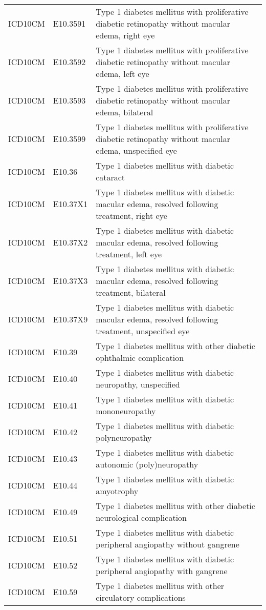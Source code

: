 \begin{longtable}{p{}p{}p{}}
  ICD10CM & E10.3591 & Type 1 diabetes mellitus with proliferative diabetic retinopathy without macular edema, right eye \\ 
  ICD10CM & E10.3592 & Type 1 diabetes mellitus with proliferative diabetic retinopathy without macular edema, left eye \\ 
  ICD10CM & E10.3593 & Type 1 diabetes mellitus with proliferative diabetic retinopathy without macular edema, bilateral \\ 
  ICD10CM & E10.3599 & Type 1 diabetes mellitus with proliferative diabetic retinopathy without macular edema, unspecified eye \\ 
  ICD10CM & E10.36 & Type 1 diabetes mellitus with diabetic cataract \\ 
  ICD10CM & E10.37X1 & Type 1 diabetes mellitus with diabetic macular edema, resolved following treatment, right eye \\ 
  ICD10CM & E10.37X2 & Type 1 diabetes mellitus with diabetic macular edema, resolved following treatment, left eye \\ 
  ICD10CM & E10.37X3 & Type 1 diabetes mellitus with diabetic macular edema, resolved following treatment, bilateral \\ 
  ICD10CM & E10.37X9 & Type 1 diabetes mellitus with diabetic macular edema, resolved following treatment, unspecified eye \\ 
  ICD10CM & E10.39 & Type 1 diabetes mellitus with other diabetic ophthalmic complication \\ 
  ICD10CM & E10.40 & Type 1 diabetes mellitus with diabetic neuropathy, unspecified \\ 
  ICD10CM & E10.41 & Type 1 diabetes mellitus with diabetic mononeuropathy \\ 
  ICD10CM & E10.42 & Type 1 diabetes mellitus with diabetic polyneuropathy \\ 
  ICD10CM & E10.43 & Type 1 diabetes mellitus with diabetic autonomic (poly)neuropathy \\ 
  ICD10CM & E10.44 & Type 1 diabetes mellitus with diabetic amyotrophy \\ 
  ICD10CM & E10.49 & Type 1 diabetes mellitus with other diabetic neurological complication \\ 
  ICD10CM & E10.51 & Type 1 diabetes mellitus with diabetic peripheral angiopathy without gangrene \\ 
  ICD10CM & E10.52 & Type 1 diabetes mellitus with diabetic peripheral angiopathy with gangrene \\ 
  ICD10CM & E10.59 & Type 1 diabetes mellitus with other circulatory complications \\ 

\end{longtable}
